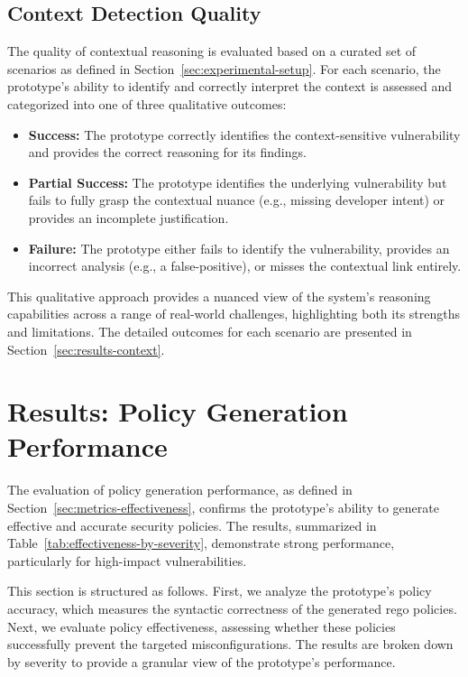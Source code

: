 \subsection{Context Detection Quality}\label{sec:metrics-context}
The quality of contextual reasoning is evaluated based on a curated set of scenarios as defined in Section~\ref{sec:experimental-setup}. For each scenario, the prototype's ability to identify and correctly interpret the context is assessed and categorized into one of three qualitative outcomes:
\begin{itemize}
    \item \textbf{Success:} The prototype correctly identifies the context-sensitive vulnerability and provides the correct reasoning for its findings.
    \item \textbf{Partial Success:} The prototype identifies the underlying vulnerability but fails to fully grasp the contextual nuance (e.g., missing developer intent) or provides an incomplete justification.
    \item \textbf{Failure:} The prototype either fails to identify the vulnerability, provides an incorrect analysis (e.g., a \gls{false-positive}), or misses the contextual link entirely.
\end{itemize}
This qualitative approach provides a nuanced view of the system's reasoning capabilities across a range of real-world challenges, highlighting both its strengths and limitations. The detailed outcomes for each scenario are presented in Section~\ref{sec:results-context}.

\section{Results: Policy Generation Performance}\label{sec:results-generation-performance}

The evaluation of policy generation performance, as defined in Section~\ref{sec:metrics-effectiveness}, confirms the prototype's ability to generate effective and accurate security policies. The results, summarized in Table~\ref{tab:effectiveness-by-severity}, demonstrate strong performance, particularly for high-impact vulnerabilities.

This section is structured as follows. First, we analyze the prototype's policy accuracy, which measures the syntactic correctness of the generated \gls{rego} policies. Next, we evaluate policy effectiveness, assessing whether these policies successfully prevent the targeted misconfigurations. The results are broken down by severity to provide a granular view of the prototype's performance.

